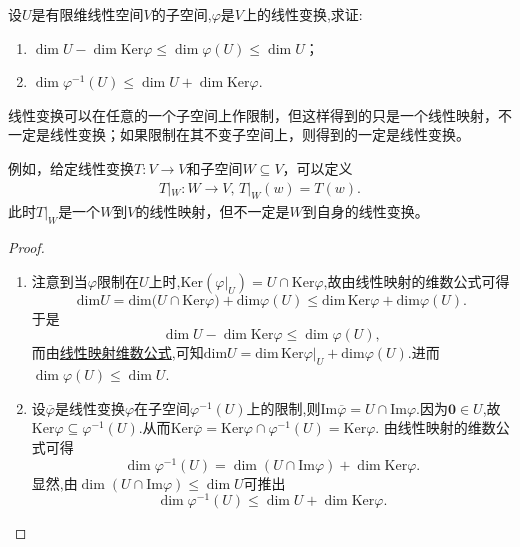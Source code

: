 \documentclass[../../main.tex]{subfiles}%
\begin{document}
\begin{proposition}\label{proposition:线性变换关于子空间的维数不等式}
设\(U\)是有限维线性空间\(V\)的子空间,\(\varphi\)是\(V\)上的线性变换,求证:
\begin{enumerate}[(1)]
\item \(\dim U-\dim\text{Ker}\varphi\leqslant \dim\varphi(U)\leqslant \dim U\)；

\item \(\dim\varphi^{-1}(U)\leqslant \dim U+\dim\text{Ker}\varphi\).
\end{enumerate}
\end{proposition}
\begin{note}
线性变换可以在任意的一个子空间上作限制，但这样得到的只是一个线性映射，不一定是线性变换；如果限制在其不变子空间上，则得到的一定是线性变换。

例如，给定线性变换$T:V\rightarrow V$和子空间$W\subseteq V$，可以定义
\begin{align*}
T|_W:W\rightarrow V,\,T|_W\left( w \right) =T\left( w \right).
\end{align*}
此时$T|_W$是一个$W$到$V$的线性映射，但不一定是$W$到自身的线性变换。
\end{note}
\begin{proof}
\begin{enumerate}[(1)]
\item 注意到当\(\varphi\)限制在\(U\)上时,\(\text{Ker}(\varphi|_U)=U\cap\text{Ker}\varphi\),故由线性映射的维数公式可得
\[
\mathrm{dim}U=\mathrm{dim(}U\cap \mathrm{Ker}\varphi )+\mathrm{dim}\varphi (U)\leqslant \mathrm{dim}\,\mathrm{Ker}\varphi +\mathrm{dim}\varphi (U).
\]
于是
\[
\dim U - \dim\text{Ker}\varphi\leqslant \dim\varphi(U),
\]
而由\hyperref[theorem:线性映射的维数公式]{线性映射维数公式},可知$\mathrm{dim}U=\mathrm{dim}\,\mathrm{Ker}\varphi |_U+\mathrm{dim}\varphi (U)$.进而\(\dim\varphi(U)\leqslant \dim U\).

\item 设\(\overline{\varphi}\)是线性变换\(\varphi\)在子空间\(\varphi^{-1}(U)\)上的限制,则\(\text{Im}\overline{\varphi}=U\cap\text{Im}\varphi\).因为\(\boldsymbol{0}\in U\),故\(\text{Ker}\varphi\subseteq\varphi^{-1}(U)\).从而\(\text{Ker}\overline{\varphi}=\text{Ker}\varphi\cap\varphi^{-1}(U)=\text{Ker}\varphi\). 由线性映射的维数公式可得
\[
\dim\varphi^{-1}(U)=\dim(U\cap\text{Im}\varphi)+\dim\text{Ker}\varphi.
\]
显然,由\(\dim(U\cap\text{Im}\varphi)\leqslant \dim U\)可推出
\[
\dim\varphi^{-1}(U)\leqslant \dim U+\dim\text{Ker}\varphi. 
\]
\end{enumerate}
\end{proof}
\end{document}
